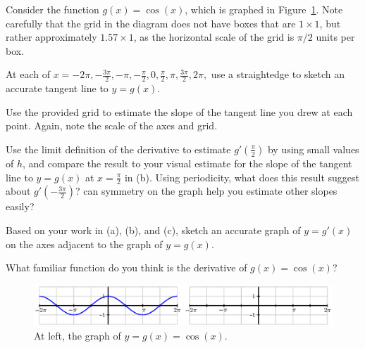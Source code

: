\vspace{-.5cm}

\begin{activity} \label{A:2.4.Act8}  Consider the function $g(x) = \cos(x)$, which is graphed in Figure~\ref{F:2.4.A8}.  Note carefully that the grid in the diagram does not have boxes that are $1 \times 1$, but rather approximately $1.57 \times 1$, as the horizontal scale of the grid is $\pi/2$ units per box.

\ba
	\item At each of $x = -2\pi, -\frac{3\pi}{2}, -\pi, -\frac{\pi}{2}, 0, \frac{\pi}{2}, \pi, \frac{3\pi}{2}, 2\pi,$ use a straightedge to sketch an accurate tangent line to $y = g(x)$.
	\item Use the provided grid to estimate the slope of the tangent line you drew at each point.  Again, note the scale of the axes and grid.
	\item Use the limit definition of the derivative to estimate $g'(\frac{\pi}{2})$ by using small values of $h$, and compare the result to your visual estimate for the slope of the tangent line to $y = g(x)$ at $x = \frac{\pi}{2}$ in (b).  Using periodicity, what does this result suggest about $g'(-\frac{3\pi}{2})$?  can symmetry on the graph help you estimate other slopes easily?  
	\item Based on your work in (a), (b), and (c), sketch an accurate graph of $y = g'(x)$ on the axes adjacent to the graph of $y = g(x)$.
	\item What familiar function do you think is the derivative of $g(x) = \cos(x)$?
\ea
\end{activity}

\vspace{-1cm}

\begin{figure}
\begin{flushleft}
\includegraphics{figures/2_2_cosine.eps}
\caption{At left, the graph of $y = g(x) = \cos(x)$.} \label{F:2.4.A8}
\end{flushleft}
\end{figure}


